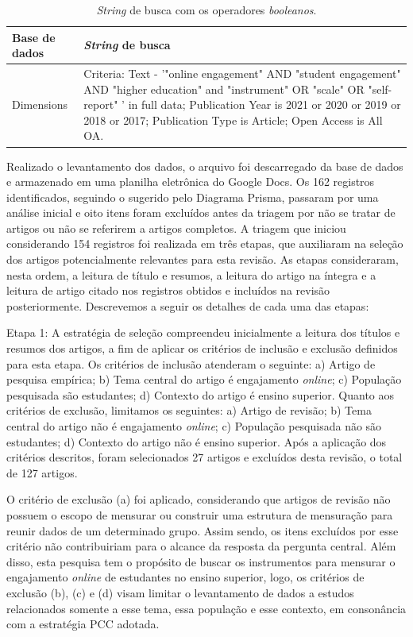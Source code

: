 \documentclass[portuguese]{textolivre}
\begin{document}
\begin{table}[htpb]
\caption{\emph{String} de busca com os operadores \emph{booleanos}.}
\label{tab1}
\centering
\begin{tabular}{p{}p{}}
\toprule 
Base de dados & \emph{String} de busca
\\
\midrule
Dimensions &
Criteria: Text - '"online engagement" AND "student engagement" AND "higher education" and "instrument" OR "scale" OR "self-report" ' in full data; Publication Year is 2021 or 2020 or 2019 or 2018 or 2017; Publication Type is Article; Open Access is All OA.
\\ 
\bottomrule
\end{tabular}
\end{table}

Realizado o levantamento dos dados, o arquivo foi descarregado da base de dados e armazenado em uma planilha eletrônica do Google Docs. Os 162 registros identificados, seguindo o sugerido pelo Diagrama Prisma, passaram por uma análise inicial e oito itens foram excluídos antes da triagem por não se tratar de artigos ou não se referirem a artigos completos. A triagem que iniciou considerando 154 registros foi realizada em três etapas, que auxiliaram na seleção dos artigos potencialmente relevantes para esta revisão. As etapas consideraram, nesta ordem, a leitura de título e resumos, a leitura do artigo na íntegra e a leitura de artigo citado nos registros obtidos e incluídos na revisão posteriormente. Descrevemos a seguir os detalhes de cada uma das etapas:

Etapa 1: A estratégia de seleção compreendeu inicialmente a leitura dos títulos e resumos dos artigos, a fim de aplicar os critérios de inclusão e exclusão definidos para esta etapa. Os critérios de inclusão atenderam o seguinte: a) Artigo de pesquisa empírica; b) Tema central do artigo é engajamento \textit{online}; c) População pesquisada são estudantes; d) Contexto do artigo é ensino superior. Quanto aos critérios de exclusão, limitamos os seguintes: a) Artigo de revisão; b) Tema central do artigo não é engajamento \textit{online}; c) População pesquisada não são estudantes; d) Contexto do artigo não é ensino superior. Após a aplicação dos critérios descritos, foram selecionados 27 artigos e excluídos desta revisão, o total de 127 artigos.

O critério de exclusão (a) foi aplicado, considerando que artigos de revisão não possuem o escopo de mensurar ou construir uma estrutura de mensuração para reunir dados de um determinado grupo. Assim sendo, os itens excluídos por esse critério não contribuiriam para o alcance da resposta da pergunta central. Além disso, esta pesquisa tem o propósito de buscar os instrumentos para mensurar o engajamento \textit{online} de estudantes no ensino superior, logo, os critérios de exclusão (b), (c) e (d) visam limitar o levantamento de dados a estudos relacionados somente a esse tema, essa população e esse contexto, em consonância com a estratégia PCC adotada.
\end{document}
